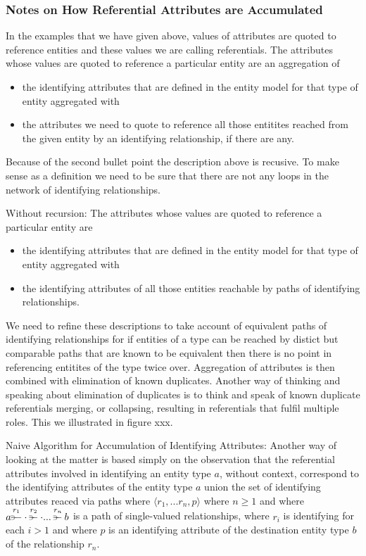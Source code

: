 \subsubsection {Notes on How Referential Attributes are Accumulated}
 \mynote
 In the examples that we have given above, values of attributes are quoted to reference entities and these values we are calling referentials.  
\mynote
The attributes whose values are quoted to reference a particular entity are
an aggregation of
\begin{itemize}
\item the
identifying attributes that are defined in the entity model for that type of entity aggregated with 
\item
the attributes we need to quote to reference all those entitites reached from the given entity by an identifying relationship, if there are any.
\end{itemize}

\mynote
Because of the second bullet point the description above is recusive. 
To make sense as a definition 
we need to be sure that there are not any loops in the network of identifying relationships.  

\mynote
Without recursion: 
The attributes whose values are quoted to reference a particular entity are 
\begin{itemize}
\item the identifying attributes that are defined in the entity model 
for that type of entity
aggregated with 
\item the identifying attributes of all those entities reachable by paths of identifying relationships.
\end{itemize}  

\mynote 
We need to refine these descriptions to take account of 
equivalent paths of identifying relationships for if
entities of a type can be reached by distict but comparable paths that are known to be equivalent then there is no point in 
referencing entitites of the type twice over. 
Aggregation of attributes is then combined with elimination of known duplicates.
Another way of thinking and speaking about elimination of duplicates is to think and speak of known duplicate referentials 
merging, or collapsing, resulting in referentials that fulfil multiple roles. This we illustrated in figure xxx. 

\mynote 
Naive Algorithm for Accumulation of Identifying Attributes:
 Another way of looking at the matter is based simply on the observation that the referential attributes involved in identifying an entity  type $a$, without
 context,  correspond to the identifying attributes of the entity type $a$ union the set of identifying attributes reaced 
 via paths 
 where  $\langle r_1,...r_n, p \rangle$ where $n \geq 1$ and where
$\overset{r_1}{a \rightpitchfork \hspace{-0.35em} -  \cdot} \overset{r_2}{\rightpitchfork \hspace{-0.35em} -} \cdot ... \overset{r_n}{\rightpitchfork \hspace{-0.35em} -} b$ is a path of single-valued relationships, where 
$r_i$ is identifying for each $i > 1$ and where $p$ is an identifying attribute of the destination entity type $b$ of the
relationship $r_n$. 

